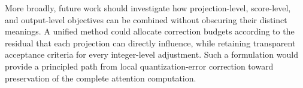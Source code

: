 \documentclass[../main.tex]{subfiles}
\begin{document}
More broadly, future work should investigate how projection-level, score-level, and output-level objectives can be combined without obscuring their distinct meanings. A unified method could allocate correction budgets according to the residual that each projection can directly influence, while retaining transparent acceptance criteria for every integer-level adjustment. Such a formulation would provide a principled path from local quantization-error correction toward preservation of the complete attention computation.

\endgroup
\end{document}
